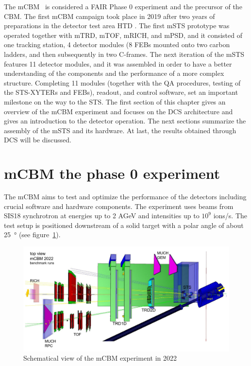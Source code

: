 The mCBM~\cite{mCBM} is considered a FAIR Phase 0 experiment and the precursor of the \gls{CBM}. The first mCBM campaign took place in 2019 after two years of preparations in the detector test area HTD \cite{progress_report_2017_sturm}. The first \gls{mSTS} prototype was operated together with mTRD, mTOF, mRICH, and mPSD, and it consisted of one tracking station, 4 detector modules (8 \gls{FEB}s mounted onto two carbon ladders, and then subsequently in two C-frames. The next iteration of the \gls{mSTS} features 11 detector modules, and it was assembled in order to have a better understanding of the components and the performance of a more complex structure. Completing 11 modules (together with the QA procedures, testing of the STS-XYTERs and \gls{FEB}s), readout, and control software, set an important milestone on the way to the STS. The first section of this chapter gives an overview of the mCBM experiment and focuses on the DCS architecture and gives an introduction to the detector operation. The next sections summarize the assembly of the \gls{mSTS} and its hardware. At last, the results obtained through DCS will be discussed. 

\section{mCBM the phase 0 experiment}
The mCBM aims to test and optimize the performance of the detectors including crucial software and hardware components. The experiment uses beams from SIS18 synchrotron at energies up to 2 AGeV and intensities up to $10^{9}$ ions/s. The test setup is positioned downstream of a solid target with a polar angle of about \SI{25}{\degree} (see figure~\ref{fig_mcbm}).

\begin{figure}[!h]
\centering
\includegraphics[width=0.7\columnwidth]{Chapter3/DCS/images/mcbm_2021_setup.png}
\caption{Schematical view of the mCBM experiment in 2022}
\label{fig_mcbm}
\end{figure}

